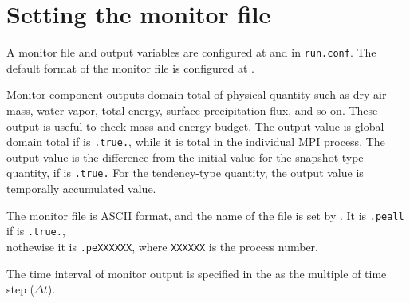 \section{Setting the monitor file} \label{sec:monitor}

A monitor file and output variables are configured at  and  in \verb|run.conf|.
The default format of the monitor file is configured at .


Monitor component outputs domain total of physical quantity such as dry air mass, water vapor, total energy, surface precipitation flux, and so on.
These output is useful to check mass and energy budget.
The output value is global domain total if  is \verb|.true.|, while it is total in the individual MPI process.
The output value is the difference from the initial value for the snapshot-type quantity, if  is \verb|.true.|
For the tendency-type quantity, the output value is temporally accumulated value.

The monitor file is ASCII format, and the name of the file is set by .
It is \verb|.peall| if  is \verb|.true.|,\\
nothewise it is \verb|.peXXXXXX|, where \verb|XXXXXX| is the process number.

The time interval of monitor output is specified in the  as the multiple of time step ($\Delta t$).



